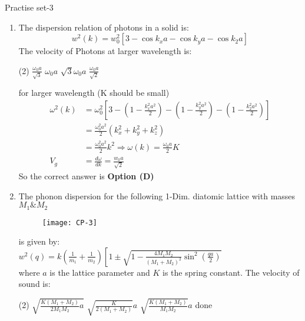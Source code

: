 \newpage
\begin{abox}
	Practise set-3
\end{abox}
\begin{enumerate}
	\item 
	The dispersion relation of photons in a solid is:
	$$
	w^{2}(k)=w_{0}^{2}\left[3-\cos k_{x} a-\cos k_{y} a-\cos k_{2} a\right]
	$$
	The velocity of Photons at larger wavelength is:
	\begin{tasks}(2)
		\task[\textbf{a.}] $\frac{\omega_{0} a}{\sqrt{3}}$
		\task[\textbf{b.}]$\omega_{0} a$
		\task[\textbf{c.}]$\sqrt{3} \omega_{0} a$
		\task[\textbf{d.}] $\frac{\omega_{0} a}{\sqrt{2}}$
	\end{tasks}
\begin{answer}
	for larger wavelength (K should be small) 
	\begin{align*}
	\omega^{2}(k)&=\omega_{0}^{2}\left[3-\left(1-\frac{k_{x}^{2} a^{2}}{2}\right)-\left(1-\frac{k_{y}^{2} a^{2}}{2}\right)-\left(1-\frac{k_{2}^{2} a^{2}}{2}\right)\right]\\
	&=\frac{\omega_{0}^{2} a^{2}}{2}\left(k_{x}^{2}+k_{y}^{2}+k_{z}^{2}\right) \\
	&=\frac{\omega_{0}^{2} a^{2}}{2} k^{2} \Rightarrow \omega(k)=\frac{\omega_{0} a}{2} K\\
	V_{g}&=\frac{d \omega}{d k}=\frac{w_{0} a}{\sqrt{2}}
	\end{align*}
	So the correct answer is \textbf{Option (D)}
\end{answer}
\item 
	The phonon dispersion for the following 1-Dim. diatomic lattice with masses $M_{1} \& M_{2}$
	\begin{figure}[H]
		\centering
		\texttt{[image: CP-3]}
	\end{figure}
	is given by:\\
	$w^{2}(q)=k\left(\frac{1}{m_{1}}+\frac{1}{m_{2}}\right)\left[1 \pm \sqrt{1-\frac{4 M_{1} M_{2}}{\left(M_{1}+M_{2}\right)^{2}} \sin ^{2}\left(\frac{q a}{2}\right)}\right.$\\
	where $a$ is the lattice parameter and $K$ is the spring constant. The velocity of sound is:
\begin{tasks}(2)
	\task[\textbf{a.}]$\sqrt{\frac{K\left(M_{1}+M_{2}\right)}{2 M_{1} M_{2}} a}$
	\task[\textbf{b.}]$\sqrt{\frac{K}{2\left(M_{1}+M_{2}\right)}} a$
	\task[\textbf{c.}]$\sqrt{\frac{K\left(M_{1}+M_{2}\right)}{M_{1} M_{2}}} a$
	\task[\textbf{d.}] done
\end{tasks}
\begin{answer}

\end{answer}
\end{enumerate}
